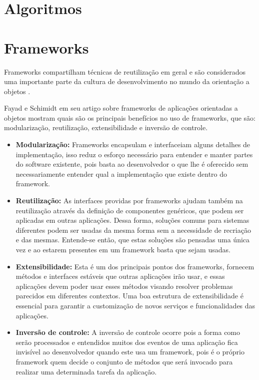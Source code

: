 \section{Algoritmos}

\section{Frameworks}

Frameworks compartilham técnicas de reutilização em geral e são considerados uma importante parte da cultura de desenvolvimento no mundo da orientação a objetos \cite{Johnson:1997}.

Fayad e Schimidt em seu artigo \cite{Fayad:Schimidt:1997} sobre frameworks de aplicações orientadas a objetos mostram quais são os principais benefícios no uso de frameworks, que são: modularização, reutilização, extensibilidade e inversão de controle.

\begin{itemize}
	\item \textbf{Modularização:} Frameworks encapsulam e interfaceiam alguns detalhes de implementação, isso reduz o esforço necessário para entender e manter partes do software existente, pois basta ao desenvolvedor o que lhe é oferecido sem necessariamente entender qual a implementação que existe dentro do framework.

	\item \textbf{Reutilização:} As interfaces providas por frameworks ajudam também na reutilização através da definição de componentes genéricos, que podem ser aplicadas em outras aplicações. Dessa forma, soluções comuns para sistemas diferentes podem ser usadas da mesma forma sem a necessidade de recriação e das mesmas. Entende-se então, que estas soluções são pensadas uma única vez e ao estarem presentes em um framework basta que sejam usadas.

	\item \textbf{Extensibilidade:} Esta é um dos principais pontos dos frameworks, fornecem métodos e interfaces estáveis que outras aplicações irão usar, e essas aplicações devem poder usar esses métodos visando resolver problemas parecidos em diferentes contextos. Uma boa estrutura de extensibilidade é essencial para garantir a customização de novos serviços e funcionalidades das aplicações.

	\item \textbf{Inversão de controle:} A inversão de controle ocorre pois a forma como serão processados e entendidos muitos dos eventos de uma aplicação fica invisível ao desenvolvedor quando este usa um framework, pois é o próprio framework quem decide o conjunto de métodos que será invocado para realizar uma determinada tarefa da aplicação.
\end{itemize}

